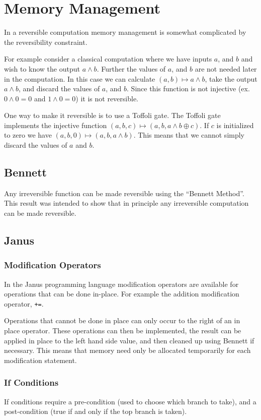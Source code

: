 \chapter{Memory Management}

In a reversible computation memory management is somewhat complicated by the reversibility constraint.

For example consider a classical computation where we have inputs $a$, and $b$ and wish to know the output $a\land b$.
Further the values of $a$, and $b$ are not needed later in the computation.
In this case we can calculate $(a,b) \mapsto a \land b$, take the output $a\land b$, and discard the values of $a$, and $b$.
Since this function is not injective (ex. $0\land 0 = 0$ and $1 \land 0 = 0$) it is not reversible.

One way to make it reversible is to use a Toffoli gate.
The Toffoli gate implements the injective function $(a,b,c) \mapsto (a,b,a\land b \oplus c)$.
If $c$ is initialized to zero we have $(a,b,0) \mapsto (a,b,a\land b)$.
This means that we cannot simply discard the values of $a$ and $b$.

\section{Bennett}
Any irreversible function can be made reversible using the ``Bennett Method''\cite{Bennett:73}.
This result was intended to show that in principle any irreversible computation can be made reversible.


\section{Janus}
\subsection{Modification Operators}
In the Janus programming language\cite{YG:2007,LD:1982} modification operators are available for operations that can be done in-place.
For example the addition modification operator, \verb|+=|.

Operations that cannot be done in place can only occur to the right of an in place operator.
These operations can then be implemented,
the result can be applied in place to the left hand side value,
and then cleaned up using Bennett if necessary.
This means that memory need only be allocated temporarily for each modification statement.

\subsection{If Conditions}
If conditions require a pre-condition (used to choose which branch to take),
and a post-condition (true if and only if the top branch is taken).

